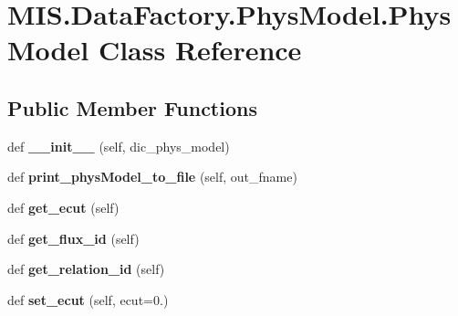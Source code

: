 \hypertarget{classMIS_1_1DataFactory_1_1PhysModel_1_1PhysModel}{}\section{M\+I\+S.\+Data\+Factory.\+Phys\+Model.\+Phys\+Model Class Reference}
\label{classMIS_1_1DataFactory_1_1PhysModel_1_1PhysModel}
\subsection*{Public Member Functions}
\begin{DoxyCompactItemize}
\item 
\mbox{\label{classMIS_1_1DataFactory_1_1PhysModel_1_1PhysModel_abc139dd5bfff699a5bbf8769bf373cd3}} 
def {\bfseries \+\_\+\+\_\+init\+\_\+\+\_\+} (self, dic\+\_\+phys\+\_\+model)
\item 
\mbox{\label{classMIS_1_1DataFactory_1_1PhysModel_1_1PhysModel_af49c757f5f6721c4033c7e5f333230da}} 
def {\bfseries print\+\_\+phys\+Model\+\_\+to\+\_\+file} (self, out\+\_\+fname)
\item 
\mbox{\label{classMIS_1_1DataFactory_1_1PhysModel_1_1PhysModel_a0f16b219a3c89987ba59e1fd2fa8e4f6}} 
def {\bfseries get\+\_\+ecut} (self)
\item 
\mbox{\label{classMIS_1_1DataFactory_1_1PhysModel_1_1PhysModel_a167e335b343c0b84a2a027671a46fe51}} 
def {\bfseries get\+\_\+flux\+\_\+id} (self)
\item 
\mbox{\label{classMIS_1_1DataFactory_1_1PhysModel_1_1PhysModel_a2eb9c39f4d8277d4b4a42b30019ea184}} 
def {\bfseries get\+\_\+relation\+\_\+id} (self)
\item 
\mbox{\label{classMIS_1_1DataFactory_1_1PhysModel_1_1PhysModel_a241b27a25f5952de96271dc4b40cd918}} 
def {\bfseries set\+\_\+ecut} (self, ecut=0.)
\item 
\mbox{\label{classMIS_1_1DataFactory_1_1PhysModel_1_1PhysModel_ab2dd95d6075a1c958ab830dd699363c7}} 

\end{DoxyCompactItemize}

